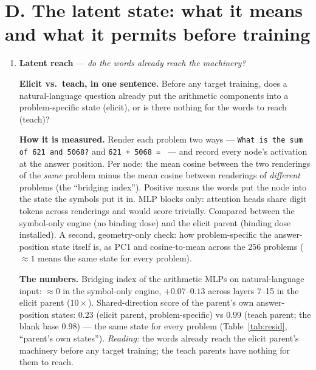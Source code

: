 \documentclass[11pt]{article}
\newcommand{\what}[1]{\par\noindent\textbf{Elicit vs.\ teach, in one sentence.} #1}
\newcommand{\how}[1]{\par\noindent\textbf{How it is measured.} #1}
\newcommand{\numbers}[1]{\par\noindent\textbf{The numbers.} #1\par\medskip}
\newcommand{\metricsec}[2]{\item \textbf{#1} --- \emph{#2}}
\begin{document}
\section*{D. The latent state: what it means and what it permits before training}
\begin{enumerate}[label=\textbf{M\arabic*}, leftmargin=*, itemsep=1.2em, resume]

\metricsec{Latent reach}{do the words already reach the machinery?}
\what{Before any target training, does a natural-language question already put the arithmetic
components into a problem-specific state (elicit), or is there nothing for the words to reach
(teach)?}
\how{Render each problem two ways --- \texttt{What is the sum of 621 and 5068?} and
\texttt{621 + 5068 = } --- and record every node's activation at the answer position. Per node:
the mean cosine between the two renderings of the \emph{same} problem minus the mean cosine
between renderings of \emph{different} problems (the ``bridging index''). Positive means the
words put the node into the state the symbols put it in. MLP blocks only: attention heads share
digit tokens across renderings and would score trivially. Compared between the symbol-only
engine (no binding dose) and the elicit parent (binding dose installed). A second, geometry-only
check: how problem-specific the answer-position state itself is, as PC1 and cosine-to-mean across
the 256 problems ($\approx1$ means the same state for every problem).}
\numbers{Bridging index of the arithmetic MLPs on natural-language input: $\approx0$ in the
symbol-only engine, $+0.07$--$0.13$ across layers 7--15 in the elicit parent ($10\times$). Shared-direction score of the parent's own answer-position states: $0.23$ (elicit parent,
problem-specific) vs $0.99$ (teach parent; the blank base $0.98$) --- the same state for every
problem (Table~\ref{tab:resid}, ``parent's own states''). \emph{Reading:} the words already reach the elicit parent's machinery
before any target training; the teach parents have nothing for them to reach.}


\end{enumerate}
\end{document}
